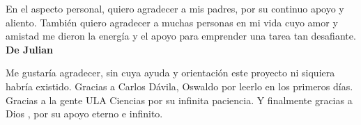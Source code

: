 En el aspecto personal, quiero agradecer a mis padres,  por su continuo apoyo y aliento. También quiero agradecer a muchas personas en mi 
vida cuyo amor y amistad me dieron la energía y el apoyo para emprender una tarea tan desafiante.\\



{\bf{De Julian}}


Me gustaría agradecer, sin cuya ayuda y orientación este proyecto
ni siquiera habría existido. Gracias a Carlos Dávila, Oswaldo  por leerlo en los primeros días. Gracias a la gente ULA Ciencias por su infinita paciencia. Y finalmente gracias a  Dios , por su apoyo eterno e infinito.









\setcounter{secnumdepth}{3}



\setcounter{tocdepth}{3}






%















